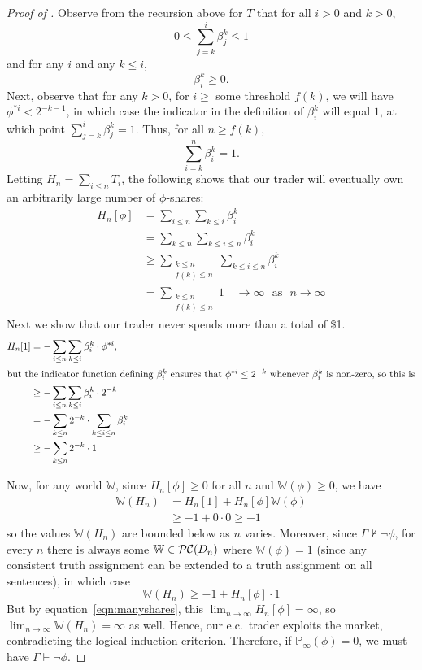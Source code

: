 \documentclass[authordate,onecolumn,noenvironments]{miri-tech-article}
\numberwithin{equation}{subsection}
\newcommand{\seq}[1]{{\overline{#1}}}
\newcommand{\nn}{n}
\newcommand{\ec}[1][\ ]{e.c.#1}
\newcommand{\lic}{logical induction criterion}
\newcommand{\trade}{T}%
\newcommand{\Trader}{\seq{\trade}} %
\newcommand{\strat}{T} %
\newcommand{\hold}{H}
\newcommand{\BelState}{\mathbb{P}}
\newcommand{\pt}{\BelState}
\newcommand{\dt}{D}
\newcommand{\pcworlds}{\mathcal{P\-C}}
\newcommand{\World}{\mathbb{W}}
\newcommand{\Theory}{\Gamma}
\begin{document}
\begin{proof}[Proof of ]
Observe from the recursion above for $\Trader$ that for all $i>0$ and $k>0$,
\[
0\le\sum_{j=k}^i\beta^k_j\le 1
\]
and for any $i$ and any $k\le i$,
\[
\beta^k_i \ge 0.
\]
Next, observe that for any $k>0$, for $i\geq$ some threshold $f(k)$, we will have 
$\phi^{*i} < 2^{-k-1}$, in which case the indicator in the definition of $\beta^k_i$ will equal $1$, at which point 
$\sum_{j=k}^i\beta^k_j = 1$.  Thus, for all $\nn\ge f(k)$,
\[
\sum_{i=k}^\nn\beta^k_i = 1.
\]
Letting $\hold_\nn=\sum_{i\le\nn}\strat_i$, the following shows that our trader will eventually own an arbitrarily large number of $\phi$-shares:
\begin{align}
\nonumber\hold_\nn[\phi]&=\sum_{i\le\nn}\sum_{k\le i}\beta^k_i\\
\nonumber &=\sum_{k\le\nn}\sum_{k\le i\le\nn}\beta^k_i\\
\nonumber &\ge \sum_{\substack{k\le\nn \\ f(k)\le\nn}}\sum_{k\le i\le\nn}\beta^k_i\\
&= \sum_{\substack{k\le\nn \\ f(k)\le\nn}} 1 \quad\to\infty\text{~ as ~}\nn\to\infty \label{eqn:manyshares}
\end{align}
Next we show that our trader never spends more than a total of \$1.
\begin{align*}
\hold_\nn[1] &= -\sum_{i\le\nn}\sum_{k\le i}\beta^k_i\cdot\phi^{*i},\\
\intertext{but the indicator function defining $\beta_i^k$ ensures that $\phi^{*i}\le 2^{-k}$ whenever $\beta^k_i$ is non-zero, so this is}
&\ge -\sum_{i\le\nn}\sum_{k\le i}\beta^k_i \cdot 2^{-k}\\
&= -\sum_{k\le\nn}2^{-k}\cdot \sum_{k\le i\le\nn}\beta^k_i \\
&\ge -\sum_{k\le\nn}2^{-k}\cdot 1\\
\end{align*}

Now, for any world $\World$, since $\hold_\nn[\phi]\ge 0$ for all $\nn$ and $\World(\phi)\geq 0$, we have 
\begin{align*}
\World(\hold_\nn) &= \hold_\nn[1] + \hold_\nn[\phi]\World(\phi)\\
&\geq -1 + 0\cdot 0 \geq -1
\end{align*}
so the values $\World(\hold_\nn)$ are bounded below as $\nn$ varies. Moreover, since $\Theory\nvdash\lnot\phi$, for every $\nn$ there is always some $\World\in\pcworlds(\dt_\nn)$ where $\World(\phi)=1$ (since any consistent truth assignment can be extended to a truth assignment on all sentences), in which case
\[
\World(\hold_\nn) \geq -1 + \hold_\nn[\phi] \cdot 1 
\]
But by equation~\ref{eqn:manyshares}, this $\lim_{\nn\to\infty}\hold_\nn[\phi] = \infty$, so 
$\lim_{\nn\to\infty}\World(\hold_\nn) = \infty$ as well.
Hence, our \ec trader exploits the market, contradicting the \lic{}.  Therefore, if $\pt_\infty(\phi)=0$, we must have $\Theory\vdash\lnot\phi$.
\end{proof}
\end{document}
